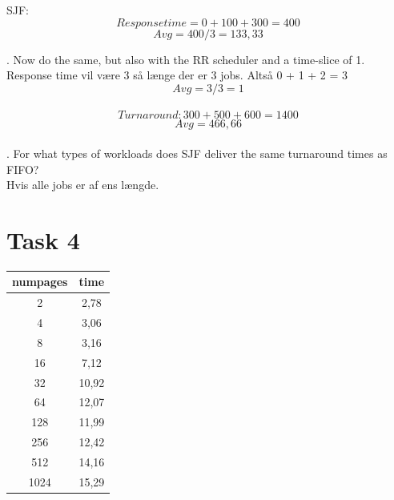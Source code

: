 \documentclass[12pt]{article}
\begin{document}
\noindent SJF:  
$$Response time = 0 + 100 + 300 = 400$$    $$Avg = 400/3 = 	133,33$$


. Now do the same, but also with the RR scheduler and a time-slice of 1.\\
Response time vil være 3 så længe der er 3 jobs. Altså 0 + 1 + 2 = 3         $$Avg = 3 / 3 = 1$$\\

$$Turnaround: 300 + 500 + 600 = 1400$$        $$Avg = 466,66$$\\

. For what types of workloads does SJF deliver the same turnaround times as FIFO?\\
Hvis alle jobs er af ens længde.


\section*{Task 4}

\begin{tabular}{|c|c|}
  \hline
  numpages & time\\
  \hline
  2 & 2,78\\
  4 & 3,06\\
  8 & 3,16\\
  16 & 7,12\\
  32 & 10,92\\
  64 & 12,07\\
  128 & 11,99\\
  256 & 12,42\\
  512 & 14,16\\
  1024 & 15,29\\
  \hline
\end{tabular}
\end{document}
